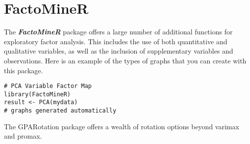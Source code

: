 \documentclass[pca-main.tex]{subfiles}
\begin{document}
 
	\newpage

\section{FactoMineR}


The \textbf{\textit{FactoMineR}} package offers a large number of additional functions for exploratory factor analysis. 
This includes the use of both quantitative and qualitative variables, as well as the inclusion of supplementary variables and observations. 
Here is an example of the types of graphs that you can create with this package.

\begin{verbatim}
# PCA Variable Factor Map 
library(FactoMineR)
result <- PCA(mydata) 
# graphs generated automatically 
\end{verbatim}

The GPARotation package offers a wealth of rotation options beyond varimax and promax.
\end{document}
